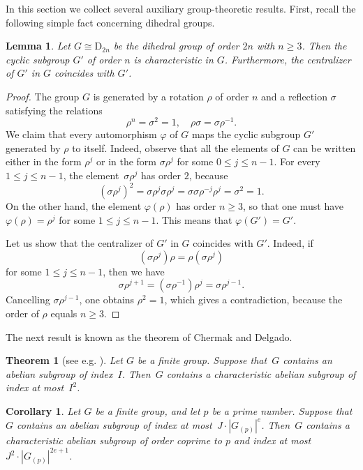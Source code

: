 \documentclass[12pt]{amsart}
\numberwithin{equation}{section}
\newtheorem{corollary}[subsection]{Corollary}
\newtheorem{lemma}[subsection]{Lemma}
\newtheorem{theorem}[subsection]{Theorem}
\theoremstyle{definition}
\newcommand{\DD}{\mathrm D}
\def \ge {\geqslant}
\def \le {\leqslant}
\begin{document}
In this section we collect several auxiliary group-theoretic results.
First, recall the following simple fact concerning dihedral groups.

\begin{lemma}\label{lemma:dihedral-group-basic}
Let $G\cong\DD_{2n}$ be the dihedral group of order $2n$ with $n\ge 3$.
Then the cyclic subgroup $G'$ of order $n$ is characteristic in $G$.
Furthermore, the centralizer of $G'$ in $G$ coincides with $G'$.
\end{lemma}

\begin{proof}
The group $G$ is generated by a rotation $\rho$ of order $n$ and a reflection $\sigma$ satisfying the relations
$$
\rho^n=\sigma^2=1, \quad  \rho\sigma=\sigma\rho^{-1}.
$$
We claim that every automorphism $\varphi$ of $G$ maps the cyclic subgroup
$G'$ generated by $\rho$ to itself. Indeed,
observe that all the elements of $G$ can be written either in the form
$\rho^j$ or in the form $\sigma\rho^j$ for some $0\le j\le n-1$.
For every~\mbox{$1\le j\le n-1$}, the element~$\sigma\rho^j$ has order $2$, because
$$
(\sigma\rho^j)^2=\sigma\rho^j\sigma\rho^j=\sigma\sigma\rho^{-j}\rho^j=\sigma^2=1.
$$
On the other hand, the element $\varphi(\rho)$ has order $n\ge 3$,
so that one must have~\mbox{$\varphi(\rho)=\rho^j$} for some $1\le j\le n-1$. This
means that $\varphi(G')=G'$.

Let us show that the centralizer of $G'$ in $G$ coincides with $G'$.
Indeed, if
$$
(\sigma\rho^j)\rho=\rho(\sigma\rho^j)
$$
for some $1\le j\le n-1$, then we have
$$
\sigma\rho^{j+1}=(\sigma\rho^{-1})\rho^j=\sigma\rho^{j-1}.
$$
Cancelling $\sigma\rho^{j-1}$, one obtains $\rho^2=1$, which gives a contradiction, because
the order of $\rho$ equals $n\ge 3$.
\end{proof}



The next result is known as the theorem of Chermak and Delgado.

\begin{theorem}[{see e.g. \cite[Theorem~1.41]{Isaacs}}]
\label{theorem:Chermak-Delgado}
Let $G$ be a finite group. Suppose that~$G$ contains an abelian subgroup
of index~$I$. Then~$G$ contains a characteristic abelian
subgroup of index at most~$I^2$.
\end{theorem}

\begin{corollary}
\label{corollary:Chermak-Delgado}
Let $G$ be a finite group, and let $p$ be a prime number.
Suppose that~$G$ contains an abelian subgroup
of index at most~$J\cdot |G_{(p)}|^e$. Then~$G$ contains a characteristic abelian
subgroup of order coprime to $p$ and index at most~\mbox{$J^2\cdot |G_{(p)}|^{2e+1}$}.
\end{corollary}
\end{document}
